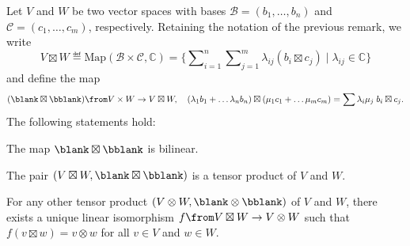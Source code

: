 \documentclass[a4paper,oneside, 12pt]{amsart}
\begin{document}
\begin{theorem}\label{thm:tensor-product-existence-and-uniqueness}
  Let \( V \) and \( W \) be two vector spaces with bases \( \mathcal{B} = (b_1, \dots, b_n) \) and \( \mathcal{C} = (c_1, \dots, c_m) \), respectively.
  Retaining the notation of the previous remark, we write
  \begin{equation*}
    V\boxtimes W \eqdef \mathrm{Map}(\mathcal{B}\times \mathcal{C}, \mathbb{C}) = \big\{ \sum\nolimits_{i=1}^{n}\sum\nolimits_{j=1}^{m}\lambda_{ij}(b_{i}\boxtimes c_{j})\mid \lambda_{ij} \in \mathbb{C}\big\}
  \end{equation*}
  and define the map
  \begin{equation*}
    (\blank \boxtimes \bblank )\from V\times W \to V \boxtimes W, \quad  (\lambda_{1} b_{1} + \dots \lambda_{n} b_{n})\boxtimes (\mu_{1}c_{1}+ \dots \mu_{m}c_{m}) = \sum \lambda_{i}\mu_{j}\; b_{i}\boxtimes c_{j}.
  \end{equation*}
  The following statements hold:
  \begin{thmlist}
    \item The map \( \blank \boxtimes \bblank \) is bilinear.
    \item The pair \( (V \boxtimes W, \blank \boxtimes \bblank) \) is a tensor product of \( V \) and \( W \).
    \item For any other tensor product \( (V \otimes W, \blank \otimes \bblank) \) of \( V \) and \( W \), there exists a unique linear isomorphism \( f \from V \boxtimes W \to V \otimes W \) such that \( f(v \boxtimes w) = v \otimes w \) for all \( v \in V \) and \( w \in W \).
  \end{thmlist}
\end{theorem}
\end{document}
